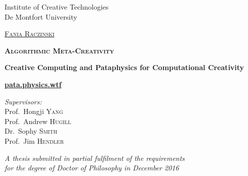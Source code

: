 
\begin{titlingpage}
\begin{center}

Institute of Creative Technologies\\
De Montfort University

\vspace{2cm}

\textsc{\huge \href{http://fania.uk}{Fania Raczinski}}

\vspace{2cm}


\textsc{\bfseries\scshape\sffamily \fontsize{40}{30}\selectfont Algorithmic Meta-Creativity}

\vspace{1.5cm}

{\huge \bfseries Creative Computing and Pataphysics for Computational Creativity}

\vspace{1.5cm}
{\Huge \textbf{\url{pata.physics.wtf}}}
\vspace{2cm}

\emph{Supervisors:}\\
{Prof.\ Hongji \textsc{Yang}}\\
{Prof.\ Andrew \textsc{Hugill}}\\
{Dr.\ Sophy \textsc{Smith}}\\
{Prof.\ Jim \textsc{Hendler}}

\vfill

\large \emph{A thesis submitted in partial fulfilment of the requirements\\ for the degree of Doctor of Philosophy in December 2016}


\end{center}
\end{titlingpage}
